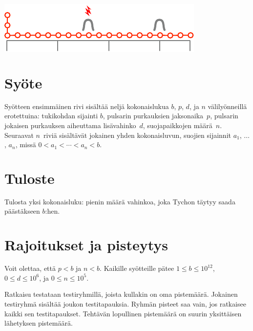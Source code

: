 \includegraphics[width=.4\textwidth]{img/sample3.pdf}

\section*{Syöte}

Syötteen ensimmäinen rivi sisältää neljä kokonaislukua $b$, $p$, $d$, ja $n$ 
välilyönneillä erotettuina:
tukikohdan sijainti $b$,
pulsarin purkauksien jaksonaika~$p$,
pulsarin jokaisen purkauksen aiheuttama lisävahinko~$d$,
suojapaikkojen määrä~$n$. 
Seuraavat $n$~riviä sisältävät jokainen yhden kokonaisluvun, 
suojien sijainnit $a_1$, $\ldots$, $a_n$, missä 
$0<a_1<\cdots <a_n< b$. %

\section*{Tuloste}

Tulosta yksi kokonaisluku: pienin määrä vahinkoa, joka Tychon täytyy saada 
päästäkseen $b$:hen. 


\section*{Rajoitukset ja pisteytys}

Voit olettaa, että
$p < b$ %
ja 
$n < b$. %
Kaikille syötteille pätee
$1\leq b\leq 10^{12}$, %
$0\leq d \leq 10^6$, %
ja
$0\leq n \leq 10^5$. %

Ratkaisu testataan testiryhmillä, joista kullakin on oma pistemäärä.
Jokainen testiryhmä sisältää joukon testitapauksia.
Ryhmän pisteet saa vain, jos ratkaisee kaikki sen testitapaukset.
Tehtävän lopullinen pistemäärä on suurin yksittäisen lähetyksen pistemäärä.


